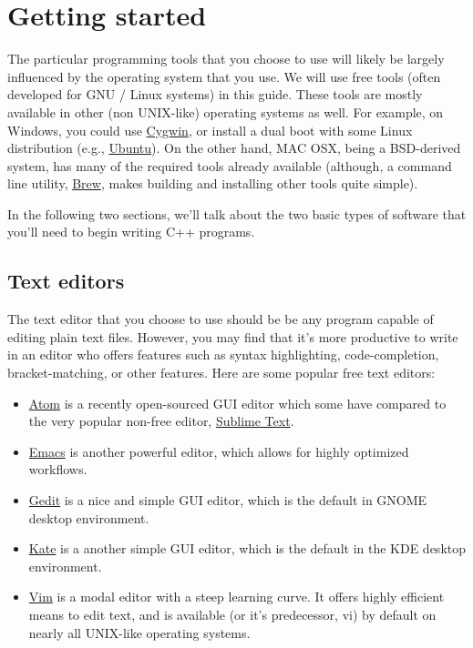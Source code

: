 \documentclass[11pt]{article}
\begin{document}
\section{Getting started}
\label{sec-2}
The particular programming tools that you choose to use will
likely be largely influenced by the operating system that you use.
We will use free tools (often developed for GNU / Linux systems) in
this guide. These tools are mostly available in other (non UNIX-like)
operating systems as well. For example, on Windows, you could use
\href{https://www.cygwin.com/}{Cygwin}, or install a dual boot with some Linux distribution 
(e.g., \href{http://www.ubuntu.com/}{Ubuntu}). On the other hand, MAC OSX, being a BSD-derived system, 
has many of the required tools already available (although, a command 
line utility, \href{http://brew.sh}{Brew}, makes building and installing other tools quite simple).

In the following two sections, we'll talk about the two basic types of 
software that you'll need to begin writing C++ programs.

\subsection{Text editors}
\label{sec-2-1}

The text editor that you choose to use should be be any program 
capable of editing plain text files. However, you may find that it's 
more productive to write in an editor who offers features such as 
syntax highlighting, code-completion, bracket-matching, or other features. 
Here are some popular free text editors:

\begin{itemize}
\item \href{https://atom.io/}{Atom} is a recently open-sourced GUI editor which some have compared to the very popular non-free editor, \href{https://sublimetext.com}{Sublime Text}.
\item \href{https://www.gnu.org/software/emacs/}{Emacs} is another powerful editor, which allows for highly optimized workflows.
\item \href{https://wiki.gnome.org/Apps/Gedit}{Gedit} is a nice and simple GUI editor, which is the default in GNOME desktop environment.
\item \href{https://kate-editor.org}{Kate} is a another simple GUI editor, which is the default in the KDE desktop environment.
\item \href{http://www.vim.org}{Vim} is a modal editor with a steep learning curve. It offers highly efficient means to edit text, and is available (or it's predecessor, vi) by default on nearly all UNIX-like operating systems.
\end{itemize}
\end{document}
